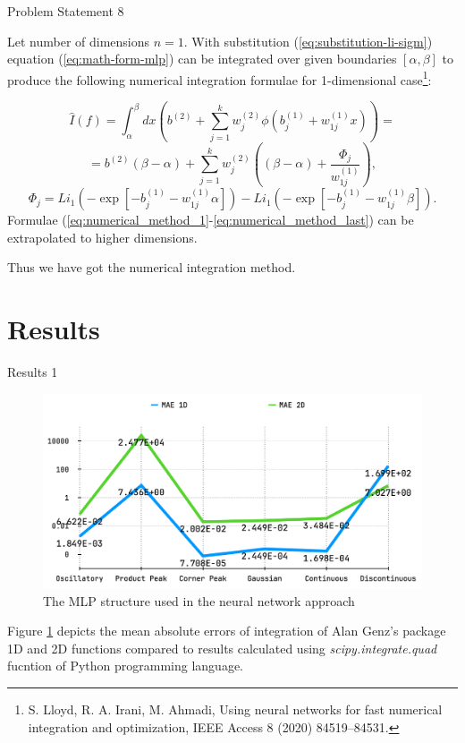 \documentclass[9pt]{beamer}
\begin{document}
\begin{frame}{Problem Statement 8}

Let number of dimensions $n = 1$. With substitution (\ref{eq:substitution-li-sigm}) equation (\ref{eq:math-form-mlp}) can be integrated over given boundaries $[\alpha, \beta]$ to produce the following numerical integration formulae for 1-dimensional case\footnote{S. Lloyd, R. A. Irani, M. Ahmadi, Using neural networks for fast numerical integration and
optimization, IEEE Access 8 (2020) 84519–84531.}:

\begin{equation*}
\hat{I}(f) = \int_{\alpha}^{\beta} dx \left(b^{(2)} + \sum_{j=1}^{k}w_j^{(2)}\phi(b_j^{(1)} + w_{1j}^{(1)}x) \right) =
\end{equation*}
\begin{equation}
= b^{(2)}(\beta - \alpha) + \sum_{j=1}^{k}w_j^{(2)} \left( (\beta - \alpha) + \frac{\Phi_j}{w_{1j}^{(1)}} \right),
\label{eq:numerical_method_1}
\end{equation}
\begin{equation}
\label{eq:numerical_method_last}
\Phi_j = Li_1(-\exp[-b_j^{(1)}-w_{1j}^{(1)}\alpha]) - Li_1(-\exp[-b_j^{(1)}-w_{1j}^{(1)}\beta]).
\end{equation}
Formulae (\ref{eq:numerical_method_1}-\ref{eq:numerical_method_last}) can be extrapolated to higher dimensions.

Thus we have got the numerical integration method.

\end{frame}

\section{Results}

\begin{frame}{Results 1}

\begin{figure}[h!]
    \centering
    \includegraphics[width=0.7\linewidth]{maes.png}
    \caption{The MLP structure used in the neural network approach}
    \label{fig:maes}
\end{figure}

Figure \ref{fig:maes} depicts the mean absolute errors of integration of Alan Genz's package 1D and 2D functions compared to results calculated using \textit{scipy.integrate.quad} fucntion of Python programming language.
    
\end{frame}
\end{document}
